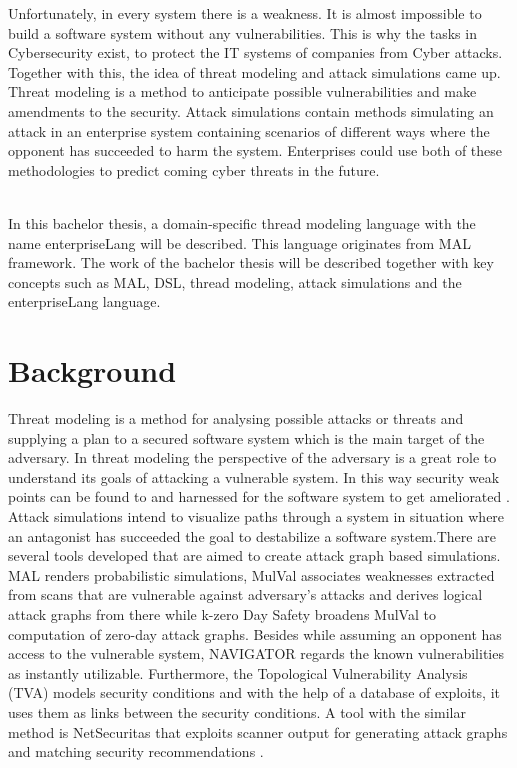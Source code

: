 \documentclass[english]{kththesis}
\begin{document}
Unfortunately, in every system there is a weakness. It is almost impossible to build a software system without any vulnerabilities. This is why the tasks in Cybersecurity exist, to protect the IT systems of companies from Cyber attacks. Together with this, the idea of threat modeling and  attack simulations came up. Threat modeling is a method to anticipate possible vulnerabilities and make amendments to the security. Attack simulations contain methods simulating an attack in an enterprise system containing scenarios of different ways where the opponent has succeeded to harm the system. Enterprises could use both of these methodologies to predict coming cyber threats in the future.

\noindent \\In this bachelor thesis, a domain-specific thread modeling language with the name enterpriseLang will be described. This language originates from \gls{MAL} framework. The work of the bachelor thesis will be described together with key concepts such as \gls{MAL}, \gls{DSL}, thread modeling, attack simulations and the enterpriseLang language.


\section{Background}
\label{sec:background}

\noindent Threat modeling is a method for analysing possible attacks or threats and supplying a plan to a secured software system which is the main target of the adversary. In threat modeling the perspective of the adversary is a great role to understand its goals of attacking a vulnerable system. In this way security weak points can be found to and harnessed for the software system to get ameliorated \cite{xiong2021cyber}.\\

\noindent Attack simulations intend to visualize paths through a system in situation where an antagonist has succeeded the goal to destabilize a software system.There are several tools developed that are aimed to create attack graph based simulations. \gls{MAL} renders probabilistic simulations, MulVal associates weaknesses extracted from scans that are vulnerable against adversary's attacks and derives logical attack graphs from there while k-zero Day Safety broadens MulVal to computation of zero-day attack graphs. Besides while assuming an opponent has access to the vulnerable system, NAVIGATOR regards the known vulnerabilities as instantly utilizable. Furthermore, the Topological Vulnerability Analysis (TVA) models security conditions and with the help of a database of exploits, it uses them as links between the security conditions. A tool with the similar method is NetSecuritas that exploits scanner output for generating attack graphs and matching security recommendations \cite{xiong2021cyber}.
\end{document}

